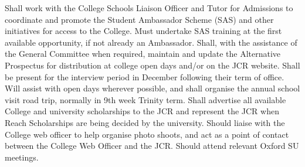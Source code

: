 Shall work with the College Schools Liaison Officer and Tutor for Admissions to coordinate and promote the Student Ambassador Scheme (SAS) and other initiatives for access to the College. 
Must undertake SAS training at the first available opportunity, if not already an Ambassador. 
Shall, with the assistance of the General Committee when required, maintain and update the Alternative Prospectus for distribution at college open days and/or on the JCR website.
Shall be present for the interview period in December following their term of office. 
Will assist with open days wherever possible, and shall organise the annual school visit road trip, normally in 9th week Trinity term.
Shall advertise all available College and university scholarships to the JCR and represent the JCR when Reach Scholarships are being decided by the university.
Should liaise with the College web officer to help organise photo shoots, and act as a point of contact between the College Web Officer and the JCR. 
Should attend relevant Oxford SU meetings. 
